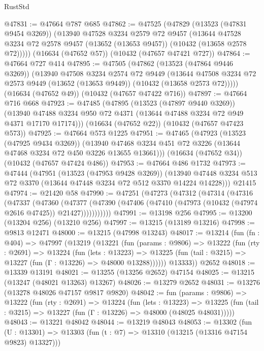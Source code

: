 \begin{lexlean}{RustStd}
\begin{coremodule}
@47831 := @47664 @787 @685
@47862 := @47525
    (@47829
      (@13523 (@47831 @9454 @3269))
      (@13940
        @47528
        @3234
        @2579
        @72
        @9457
        (@13644 @47528 @3234 @72 @2578 @9457 (@13652 (@13653 @9457)) (@10432 (@13658 @2578 @72)))))
    (@16634 (@47652 @57))
    (@10432 (@47657 @47421 @727))
@47864 := @47664 @727 @414
@47895 := @47505
    (@47862
      (@13523 (@47864 @9446 @3269))
      (@13940
        @47508
        @3234
        @2574
        @72
        @9449
        (@13644 @47508 @3234 @72 @2573 @9449 (@13652 (@13653 @9449)) (@10432 (@13658 @2573 @72)))))
    (@16634 (@47652 @49))
    (@10432 (@47657 @47422 @716))
@47897 := @47664 @716 @668
@47923 := @47485
    (@47895
      (@13523 (@47897 @9440 @3269))
      (@13940 @47488 @3234 @950 @72 @4371 (@13644 @47488 @3234 @72 @949 @4371 @17170 @17174)))
    (@16634 (@47652 @22))
    (@10432 (@47657 @47423 @573))
@47925 := @47664 @573 @1225
@47951 := @47465
    (@47923
      (@13523 (@47925 @9434 @3269))
      (@13940 @47468 @3234 @451 @72 @3226 (@13644 @47468 @3234 @72 @450 @3226 @13655 @13661)))
    (@16634 (@47652 @34))
    (@10432 (@47657 @47424 @486))
@47953 := @47664 @486 @1732
@47973 := @47444
    (@47951
      (@13523 (@47953 @9428 @3269))
      (@13940 @47448 @3234 @513 @72 @3370 (@13644 @47448 @3234 @72 @512 @3370 @14224 @14228)))
    @21415
@47974 := @21420 @58
@47990 := @47251
    (@47273
      (@47312
        (@47314
          (@47316
            (@47337
              (@47360
                (@47377
                  (@47390 (@47406 (@47410 (@47973 (@10432 (@47974 @2616 @47425)) @21427)))))))))))
@47991 := @13198 @256
@47995 := @13200 (@13204 @256) (@13210 @256)
@47997 := @13215 (@13189 @13216)
@47998 := @9813 @12471
@48000 := @13215 (@47998 @13243)
@48017 := @13214
    (fun (fn : @404) =>
    @47997
      (@13219
        (@13221
          (fun (params : @9806) =>
          @13222
            (fun (rty : @2691) =>
            @13224
              (fun (lets : @13223) =>
              @13225 (fun (tail : @3215) => @13227 (fun (Γ : @13226) => @48000 @13288))))))
        @13333))
    @2652
@48018 := @13339 @13191
@48021 := @13255 (@13256 @2652) @47154
@48025 := @13215 (@13247 (@48021 @13263) @13267)
@48026 := @13279 @2652
@48031 := @13276 (@13278 @48026 @47157 @9817 @9820)
@48042 := fun (params : @9806) =>
  @13222
    (fun (rty : @2691) =>
    @13224
      (fun (lets : @13223) =>
      @13225 (fun (tail : @3215) => @13227 (fun (Γ : @13226) => @48000 (@48025 @48031)))))
@48043 := @13221 @48042
@48044 := @13219 @48043
@48053 := @13302
    (fun (U : @13301) => @13303 (fun (t : @7) => @13310 (@13215 (@13316 @47154 @9823) @13327)))

\end{coremodule}
\end{lexlean}
